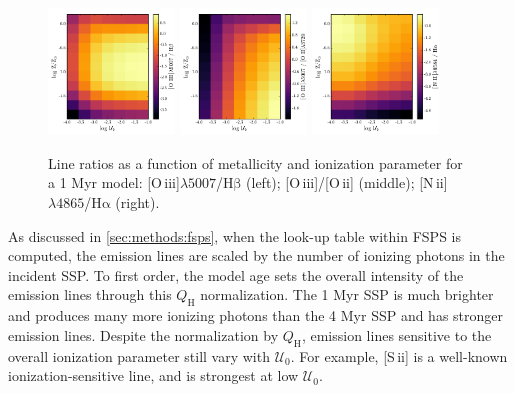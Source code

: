 \documentclass[trackchanges, twocolumn, tighten]{aastex61}
\newcommand{\Sec}[1]{\autoref{sec:#1}}
\newcommand{\FSPS}{{\sc FSPS}\xspace}
\newcommand{\nii}{[N\,{\sc ii}]\xspace}
\newcommand{\sii}{[S\,{\sc ii}]\xspace}
\newcommand{\oiii}{[O\,{\sc iii}]\xspace}
\newcommand{\oii}{[O\,{\sc ii}]\xspace}
\newcommand{\ha}{\ensuremath{\mathrm{H\alpha}}}
\newcommand{\hb}{\ensuremath{\mathrm{H\beta}}}
\newcommand\lam[1]{\ensuremath{\lambda #1}}
\newcommand{\QH}{\ensuremath{Q_{\mathrm{H}}}}
\newcommand{\U}{\ensuremath{\mathcal{U}_{0}}}
\newcommand\niiha{\nii{}\lam{4865}/\ha{}}
\newcommand\oiiihb{\oiii{}\lam{5007}/\hb{}}
\newcommand\oiiioii{\oiii{}/\oii{}}
\begin{document}
\begin{figure}[Ht!]
  \begin{centering}
    \includegraphics[width=0.3\textwidth]{f14a.pdf}
    \includegraphics[width=0.3\textwidth]{f14b.pdf}
    \includegraphics[width=0.3\textwidth]{f14c.pdf}
    \caption{Line ratios as a function of metallicity and ionization parameter for a 1 Myr model: \oiiihb{} (left); \oiiioii{} (middle); \niiha{} (right).}
    \label{fig:LineRatios}
  \end{centering}
\end{figure}

As discussed in \Sec{methods:fsps}, when the look-up table within \FSPS is computed, the emission lines are scaled by the number of ionizing photons in the incident SSP. To first order, the model age sets the overall intensity of the emission lines through this \QH{} normalization. The 1 Myr SSP is much brighter and produces many more ionizing photons than the 4 Myr SSP and has stronger emission lines. Despite the normalization by \QH{}, emission lines sensitive to the overall ionization parameter still vary with \U{}. For example, \sii{} is a well-known ionization-sensitive line, and is strongest at low \U{}.
\end{document}
